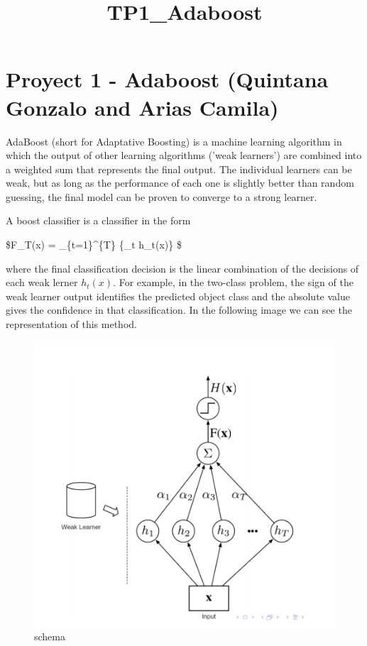 \documentclass[11pt]{article}
\title{TP1\_Adaboost}
\makeatletter
\def\maxwidth{\ifdim\Gin@nat@width>\linewidth\linewidth
    \else\Gin@nat@width\fi}
\let\Oldincludegraphics\includegraphics
\renewcommand{\includegraphics}[1]{\Oldincludegraphics[width=.8\maxwidth]{#1}}
\makeatother
\begin{document}
    
    
    \maketitle
    
    

    
    \section{Proyect 1 - Adaboost (Quintana Gonzalo and Arias
Camila)}\label{proyect-1---adaboost-quintana-gonzalo-and-arias-camila}

    AdaBoost (short for Adaptative Boosting) is a machine learning algorithm
in which the output of other learning algorithms ('weak learners') are
combined into a weighted sum that represents the final output. The
individual learners can be weak, but as long as the performance of each
one is slightly better than random guessing, the final model can be
proven to converge to a strong learner.

    A boost classifier is a classifier in the form

\$F\_T(x) = \sum\_\{t=1\}\^{}\{T\} \{\alpha\_t h\_t(x)\} \$

where the final classification decision is the linear combination of the
decisions of each weak lerner \(h_t(x)\). For example, in the two-class
problem, the sign of the weak learner output identifies the predicted
object class and the absolute value gives the confidence in that
classification. In the following image we can see the representation of
this method.

    \begin{figure}
\centering
\includegraphics{img1.png}
\caption{schema}
\end{figure}
\end{document}
